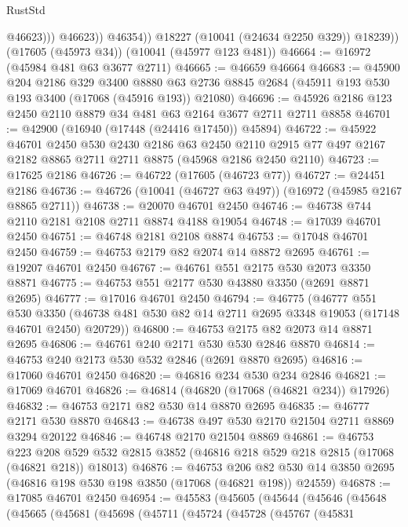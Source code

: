 \begin{lexlean}{RustStd}
\begin{coremodule}
                      @46623)))
                @46623))
            @46354))
        @18227
        (@10041 (@24634 @2250 @329))
        @18239))
    (@17605 (@45973 @34))
    (@10041 (@45977 @123 @481))
@46664 := @16972 (@45984 @481 @63 @3677 @2711)
@46665 := @46659 @46664
@46683 := @45900
    @204
    @2186
    @329
    @3400
    @8880
    @63
    @2736
    @8845
    @2684
    (@45911 @193 @530 @193 @3400 (@17068 (@45916 @193)) @21080)
@46696 := @45926 @2186 @123 @2450 @2110 @8879 @34 @481 @63 @2164 @3677 @2711 @2711 @8858
@46701 := @42900 (@16940 (@17448 (@24416 @17450)) @45894)
@46722 := @45922
    @46701
    @2450
    @530
    @2430
    @2186
    @63
    @2450
    @2110
    @2915
    @77
    @497
    @2167
    @2182
    @8865
    @2711
    @2711
    @8875
    (@45968 @2186 @2450 @2110)
@46723 := @17625 @2186
@46726 := @46722 (@17605 (@46723 @77))
@46727 := @24451 @2186
@46736 := @46726 (@10041 (@46727 @63 @497)) (@16972 (@45985 @2167 @8865 @2711))
@46738 := @20070 @46701 @2450
@46746 := @46738 @744 @2110 @2181 @2108 @2711 @8874 @4188 @19054
@46748 := @17039 @46701 @2450
@46751 := @46748 @2181 @2108 @8874
@46753 := @17048 @46701 @2450
@46759 := @46753 @2179 @82 @2074 @14 @8872 @2695
@46761 := @19207 @46701 @2450
@46767 := @46761 @551 @2175 @530 @2073 @3350 @8871
@46775 := @46753 @551 @2177 @530 @43880 @3350 (@2691 @8871 @2695)
@46777 := @17016 @46701 @2450
@46794 := @46775
    (@46777
      @551
      @530
      @3350
      (@46738 @481 @530 @82 @14 @2711 @2695 @3348 @19053 (@17148 @46701 @2450) @20729))
@46800 := @46753 @2175 @82 @2073 @14 @8871 @2695
@46806 := @46761 @240 @2171 @530 @530 @2846 @8870
@46814 := @46753 @240 @2173 @530 @532 @2846 (@2691 @8870 @2695)
@46816 := @17060 @46701 @2450
@46820 := @46816 @234 @530 @234 @2846
@46821 := @17069 @46701
@46826 := @46814 (@46820 (@17068 (@46821 @234)) @17926)
@46832 := @46753 @2171 @82 @530 @14 @8870 @2695
@46835 := @46777 @2171 @530 @8870
@46843 := @46738 @497 @530 @2170 @21504 @2711 @8869 @3294 @20122
@46846 := @46748 @2170 @21504 @8869
@46861 := @46753
    @223
    @208
    @529
    @532
    @2815
    @3852
    (@46816 @218 @529 @218 @2815 (@17068 (@46821 @218)) @18013)
@46876 := @46753
    @206
    @82
    @530
    @14
    @3850
    @2695
    (@46816 @198 @530 @198 @3850 (@17068 (@46821 @198)) @24559)
@46878 := @17085 @46701 @2450
@46954 := @45583
    (@45605
      (@45644
        (@45646
          (@45648
            (@45665
              (@45681
                (@45698
                  (@45711
                    (@45724
                      (@45728
                        (@45767
                          (@45831

\end{coremodule}
\end{lexlean}
